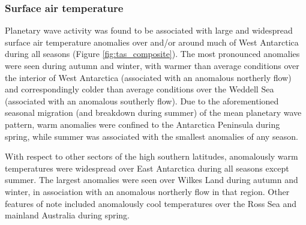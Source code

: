\subsubsection{Surface air temperature}

Planetary wave activity was found to be associated with large and widespread surface air temperature anomalies over and/or around much of West Antarctica during all seasons (Figure \ref{fig:tas_composite}). The most pronounced anomalies were seen during autumn and winter, with warmer than average conditions over the interior of West Antarctica (associated with an anomalous northerly flow) and correspondingly colder than average conditions over the Weddell Sea (associated with an anomalous southerly flow). Due to the aforementioned seasonal migration (and breakdown during summer) of the mean planetary wave pattern, warm anomalies were confined to the Antarctica Peninsula during spring, while summer was associated with the smallest anomalies of any season.  

With respect to other sectors of the high southern latitudes, anomalously warm temperatures were widespread over East Antarctica during all seasons except summer. The largest anomalies were seen over Wilkes Land during autumn and winter, in association with an anomalous northerly flow in that region. Other features of note included anomalously cool temperatures over the Ross Sea and mainland Australia during spring.

